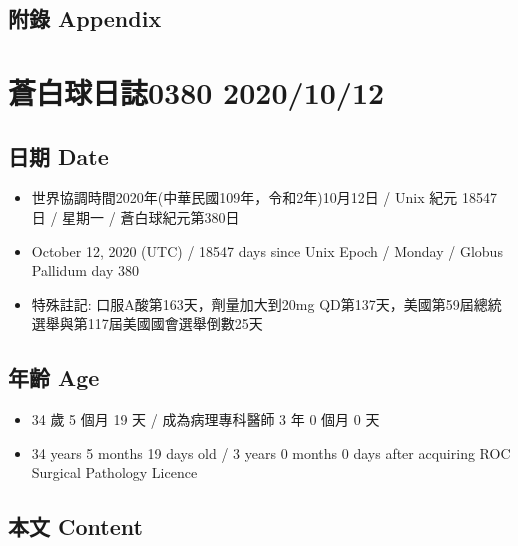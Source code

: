 \documentclass[a5paper, 11pt
]{book}
\providecommand{\tightlist}{%
  \setlength{\itemsep}{0pt}\setlength{\parskip}{0pt}}
\begin{document}
\hypertarget{ux9644ux9304-appendix-37}{%
\subsection{附錄 Appendix}\label{ux9644ux9304-appendix-37}}

\hypertarget{ux84bcux767dux7403ux65e5ux8a8c0380-20201012}{%
\section{蒼白球日誌0380
2020/10/12}\label{ux84bcux767dux7403ux65e5ux8a8c0380-20201012}}

\hypertarget{ux65e5ux671f-date-38}{%
\subsection{日期 Date}\label{ux65e5ux671f-date-38}}

\begin{itemize}
\tightlist
\item
  世界協調時間2020年(中華民國109年，令和2年)10月12日 / Unix 紀元 18547
  日 / 星期一 / 蒼白球紀元第380日
\item
  October 12, 2020 (UTC) / 18547 days since Unix Epoch / Monday / Globus
  Pallidum day 380
\item
  特殊註記: 口服A酸第163天，劑量加大到20mg
  QD第137天，美國第59屆總統選舉與第117屆美國國會選舉倒數25天
\end{itemize}

\hypertarget{ux5e74ux9f61-age-38}{%
\subsection{年齡 Age}\label{ux5e74ux9f61-age-38}}

\begin{itemize}
\tightlist
\item
  34 歲 5 個月 19 天 / 成為病理專科醫師 3 年 0 個月 0 天
\item
  34 years 5 months 19 days old / 3 years 0 months 0 days after
  acquiring ROC Surgical Pathology Licence
\end{itemize}

\hypertarget{ux672cux6587-content-38}{%
\subsection{本文 Content}\label{ux672cux6587-content-38}}
\end{document}
